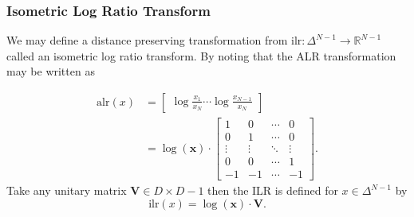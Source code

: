 \documentclass[11pt]{article}
\newcommand{\abs}[1]{\left| #1 \right|}
\begin{document}



\subsubsection{Isometric Log Ratio Transform}

We may define a distance preserving transformation from $\textrm{ilr}:\Delta^{N-1} \rightarrow \mathbb{R}^{N-1}$ called an isometric log ratio transform. By noting that the ALR transformation may be written as

\[
  \begin{aligned}
 \textrm{alr}(x) &= \begin{bmatrix}\displaystyle
    \log \frac{x_1}{x_N} \cdots \log \frac{x_{N-1}}{x_N}
  \end{bmatrix} \\
  &= \log(\mathbf{x}) \cdot \begin{bmatrix}\displaystyle
                    1 & 0 & \cdots & 0 \\
                    0 & 1 & \cdots & 0 \\
                    \vdots & \vdots & \ddots & \vdots \\
                    0 & 0 & \cdots & 1 \\
                    -1 & -1 & \cdots & -1
                    \end{bmatrix}.
  \end{aligned}
\]
Take any unitary matrix $\mathbf{V} \in D \times D - 1$ then the ILR is defined for $x \in \Delta^{N-1}$ by
\[
  \textrm{ilr}(x)
  = \log(\mathbf{x}) \cdot \mathbf{V}.
\]
\end{document}
